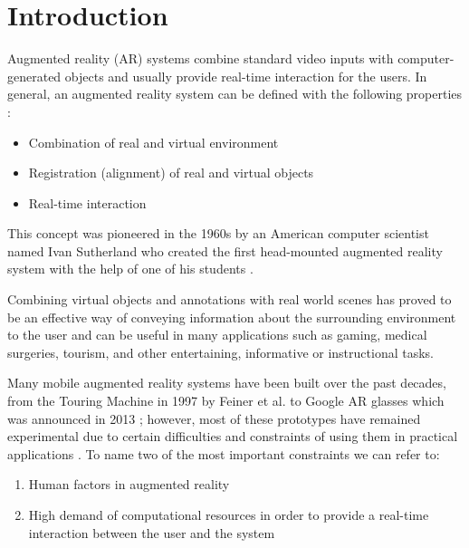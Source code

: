 \chapter{Introduction}
\label{chap:Introduction}

Augmented reality (AR) systems combine standard video inputs with computer-generated objects and
usually provide real-time interaction for the users. 
In general, an augmented reality system can be defined with the following properties \cite{azuma01} :
\begin{itemize}
\item Combination of real and virtual environment
\item Registration (alignment) of real and virtual objects
\item Real-time interaction
\end{itemize}
This concept was pioneered in the 1960s by an American computer scientist named Ivan Sutherland
who created the first head-mounted augmented reality
system with the help of one of his students \cite{azuma01}.

Combining virtual objects and annotations with real
world scenes has proved to be an effective way of conveying information about the surrounding environment to
the user and can be useful in many applications such as gaming, medical surgeries, tourism, and other entertaining, informative or instructional tasks.

Many mobile augmented reality systems have been built over the past decades, from the Touring Machine in 1997 by Feiner et al. \cite{fei97} 
to Google AR glasses which was announced in 2013 \cite{google}; however, most of these prototypes have remained experimental
due to certain difficulties and constraints of using them in practical applications \cite{dras96,liv05}. To name two of the most important constraints
we can refer to:
\begin{enumerate}
\item Human factors in augmented reality 
\item High demand of computational resources in order to provide a real-time interaction between the user and the system
\end{enumerate}

